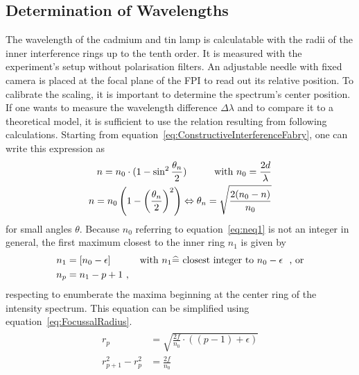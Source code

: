 \subsection{Determination of Wavelengths}
\label{toc:WavelengthDetermination}
The wavelength of the cadmium and tin lamp is calculatable with the radii of the inner interference rings up to the tenth order.
It is measured with the experiment's setup without polarisation filters.
An adjustable needle with fixed camera is placed at the focal plane of the FPI to read out its relative position.
To calibrate the scaling, it is important to determine the spectrum's center position.
If one wants to measure the wavelength difference $\Delta \lambda$ and to compare it to a theoretical model, it is sufficient to use the relation resulting from following calculations.
Starting from equation~\ref{eq:ConstructiveInterferenceFabry}, one can write this expression as
\begin{align}
	\label{eq:neq1}
	\begin{split}
	n = n_0 \cdot (1 - \sin^2\frac{\theta_n}{2}) \hspace{1.0cm} \text{with }  n_0=\frac{2d}{\lambda}\\
	n = n_0\left(1-\left(\frac{\theta_n}{2}\right)^2\right) \Leftrightarrow \theta_n = \sqrt{\frac{2(n_0 - n)}{n_0}}
	\end{split}
\end{align}
for small angles $\theta$.
Because $n_0$ referring to equation~\ref{eq:neq1} is not an integer in general, the first maximum closest to the inner ring $n_1$ is given by 
\begin{align}
	\label{eq:neq2}
	\begin{split}
	n_1 	&= \left[n_0-\epsilon\right] \hspace{1.0cm} \text{with } n_1 \widehat{=} \text{ closest integer to } n_0 - \epsilon \text{ , or}\\
	n_p 	&=n_1 - p + 1 \ ,
	\end{split}
\end{align}
respecting to enumberate the maxima beginning at the center ring of the intensity spectrum.
This equation can be simplified using equation~\ref{eq:FocussalRadius}.
\begin{align}
	\label{eq:RSqLambda}
	\begin{split}
	r_p			&= \sqrt{\frac{2f}{n_0} \cdot \left((p-1) + \epsilon\right)}\\
	r_{p+1}^2-r_{p}^2 	&= \frac{2f}{n_0}
	\end{split}
\end{align}
